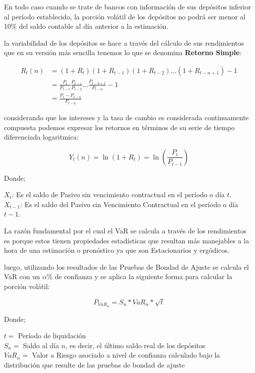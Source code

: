 \documentclass[]{article}
\begin{document}
En todo caso cuando se trate de bancos con información de sus depósitos
inferior al período establecido, la porción volátil de los depósitos no
podrá ser menor al 10\% del saldo contable al día anterior a la
estimación.

la variabilidad de los depósitos se hace a través del cálculo de sus
rendimientos que en su versión más sencilla tenemos lo que se denomina
\textbf{Retorno Simple}:

\[\begin{array}{rl}
R_{t}(n) &\displaystyle= \left(1+R_{t}\right) \left(1+R_{t-1}\right) \left(1+R_{t-2}\right) \ldots \left(1+R_{t-n+1}\right) -1\\
&\displaystyle= \frac{P_t}{P_{t-1}} \frac{P_{t-1}}{P_{t-2}} \ldots \frac{P_{t-n+1}}{P_{t-n}}-1\\
&\displaystyle= \frac{P_{t}-P_{t-n}}{P_{t-n}}
\end{array}\]

considerando que los intereses y la tasa de cambio es considerada
continuamente compuesta podemos expresar los retornos en términos de su
serie de tiempo diferenciada logaritmica:

\[Y_{t}(n)=\ln(1+R_{t})=\ln \left(\frac{P_{t}}{P_{t-1}}\right)\]

Donde;

\(X_t\): Es el saldo de Pasivo sin vencimiento contractual en el período
o día \(t\).\\
\(X_{t-1}\): Es el saldo del Pasivo sin Vencimiento Contractual en el
período o día \(t-1\).

La razón fundamental por el cual el VaR se calcula a través de los
rendimientos es porque estos tienen propiedades estadísticas que
resultan más manejables a la hora de una estimación o pronóstico ya que
son Estacionarios y ergódicos.

luego, utilizando los resultados de las Pruebas de Bondad de Ajuste se
calcula el VaR con un \(\alpha\)\% de confianza y se aplica la siguiente
forma para calcular la porción volátil:

\[P_{VaR_{\alpha}} = S_n * VaR_{\alpha} * \sqrt{t}\]

Donde;

\(t=\) Período de liquidación\\
\(S_n=\) Saldo al día \(n\), es decir, el último saldo real de los
depósitos\\
\(VaR_{\alpha}=\) Valor a Riesgo asociado a nivel de confianza calculado
bajo la distribución que resulte de las pruebas de bondad de ajuste
\end{document}
